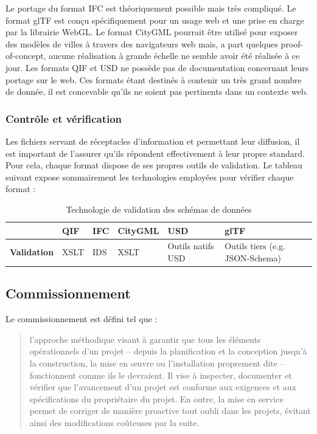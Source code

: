Le portage du format IFC est théoriquement possible mais très compliqué. \cite{buildingsmartIfcOWLBuildingSMART,sciencedirectEXPRESSConstruction}
Le format glTF est conçu spécifiquement pour un usage web et une prise en charge par la librairie WebGL. \cite{githubGlTFTutorialsgltfTutorialgltfTutorial_001_IntroductionmdMain}
Le format CityGML pourrait être utilisé pour exposer des modèles de villes à travers des navigateurs web \cite{el-mekawyIntegratingBIMGIS2010,prandi3DWebVisualization2015} mais, a part quelques proof-of-concept, aucune réalisation à grande échelle ne semble avoir été réalisée à ce jour.
Les formats QIF et USD ne possède pas de documentation concernant leurs portage sur le web. Ces formats étant destinés à contenir un très grand nombre de donnée, il est concevable qu'ils ne soient pas pertinents dans un contexte web. 

\subsubsection{Contrôle et vérification}

Les fichiers servant de réceptacles d'information et permettant leur diffusion, il est important de l'assurer qu'ils répondent effectivement à leur propre standard. Pour cela, chaque format dispose de ses propres outils de validation. 
Le tableau suivant expose sommairement les technologies employées pour vérifier chaque format :

\begin{table}[!h]
    \centering
    \caption{Technologie de validation des schémas de données}
    \renewcommand{\arraystretch}{1.5} 
    \small
    \begin{tabularx}{\textwidth}{|l|X|X|X|X|X|} 
        \hline
        \rowcolor{white!75!black} \textbf{} & \textbf{QIF} & \textbf{IFC} & \textbf{CityGML} & \textbf{USD} & \textbf{glTF}\\
        \hline
        \textbf{Validation} & XSLT & IDS & XSLT & Outils natifs USD & Outils tiers (e.g. JSON-Schema) \\
        \hline
    \end{tabularx}
\end{table}

\newpage

\subsection{Commissionnement}

Le commissionnement est défini tel que :
\begin{quote}
    l’approche méthodique visant à garantir que tous les éléments opérationnels d’un projet – depuis la planification et la conception jusqu’à la construction, la mise en œuvre ou l’installation proprement dite – fonctionnent comme ils le devraient. Il vise à inspecter, documenter et vérifier que l’avancement d’un projet est conforme aux exigences et aux spécifications du propriétaire du projet. En outre, la mise en service permet de corriger de manière proactive tout oubli dans les projets, évitant ainsi des modifications coûteuses par la suite.\cite{safetycultureCommissionnementDfinition}
\end{quote}

